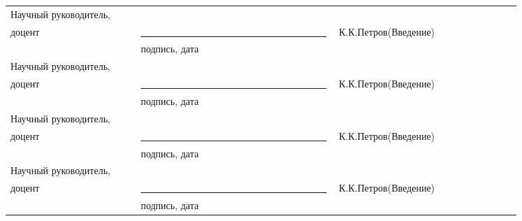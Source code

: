 \Executors %
\begin{longtable}{p{0.25\linewidth}p{0.25\linewidth}p{0.35\linewidth}}
	Научный руководитель, 	&		&	\\
	доцент 	& \underline{~~~~~~~~~~~~~~~~~~~~~~~~~~~~~~~~~~~~~~}& К.К.Петров(Введение) \\ \vspace{1cm}
	&  { \hspace{10mm} подпись, дата} & \\
	Научный руководитель, 	&		&	\\
	доцент 	& \underline{~~~~~~~~~~~~~~~~~~~~~~~~~~~~~~~~~~~~~~}& К.К.Петров(Введение) \\ \vspace{1cm}
	&  { \hspace{10mm} подпись, дата} & \\
	Научный руководитель, 	&		&	\\
	доцент 	& \underline{~~~~~~~~~~~~~~~~~~~~~~~~~~~~~~~~~~~~~~}& К.К.Петров(Введение) \\ \vspace{1cm}
	&  { \hspace{10mm} подпись, дата} & \\
	Научный руководитель, 	&		&	\\
	доцент 	& \underline{~~~~~~~~~~~~~~~~~~~~~~~~~~~~~~~~~~~~~~}& К.К.Петров(Введение) \\ \vspace{1cm}
	&  { \hspace{10mm} подпись, дата} & \\		
\end{longtable}
